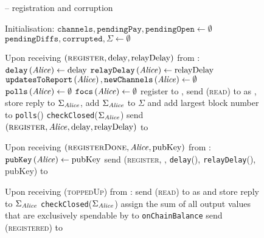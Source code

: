   \begin{figure}[H]
    \begin{systembox}{\fpaynet{} -- registration and corruption}
      \begin{algorithmic}[1]
        \State Initialisation:
        \Indent
          \State $\mathtt{channels}, \mathtt{pendingPay}, \mathtt{pendingOpen}
          \gets \emptyset$
          \State $\texttt{pendingDiffs}, \mathtt{corrupted}, \Sigma
          \gets \emptyset$
        \EndIndent
        \Statex

        \State Upon receiving $\left(\textsc{register}, \mathrm{delay},
        \mathrm{relayDelay}\right)$ from \alice:
        \Indent
          \State $\mathtt{delay}\left(\mathit{Alice}\right) \gets \mathrm{delay}$
          \State $\mathtt{relayDelay}\left(\mathit{Alice}\right) \gets
          \mathrm{relayDelay}$
          \State $\mathtt{updatesToReport}\left(\mathit{Alice}\right),
          \mathtt{newChannels}\left(\mathit{Alice}\right) \gets \emptyset$
          \State $\mathtt{polls}\left(\mathit{Alice}\right) \gets \emptyset$
          \State $\mathtt{focs}\left(\mathit{Alice}\right) \gets \emptyset$
          \State register \alice{} to \ledger{},
          send (\textsc{read}) to \ledger{} as \alice{}, store reply to
          $\Sigma_{\mathit{Alice}}$, add $\Sigma_{\mathit{Alice}}$ to $\Sigma$ and add largest
          block number to \texttt{polls}(\alice)
          \label{alg:fpaynet:support:read}
          \State \texttt{checkClosed}($\Sigma_{\mathit{Alice}}$)
          \State send $\left(\textsc{register}, \mathit{Alice}, \mathrm{delay},
          \mathrm{relayDelay}\right)$ to \simulator
        \EndIndent
        \Statex

        \State Upon receiving $\left(\textsc{registerDone}, \mathit{Alice},
        \mathrm{pubKey}\right)$ from \simulator:
        \Indent
          \State $\mathtt{pubKey}\left(\mathit{Alice}\right) \gets \mathrm{pubKey}$
          \State send (\textsc{register}, \alice, \texttt{delay}(\alice),
          \texttt{relayDelay}(\alice), pubKey) to \alice
        \EndIndent
        \Statex

        \State Upon receiving (\textsc{toppedUp}) from \alice:
        \Indent
          \State send (\textsc{read}) to \ledger{} as \alice{} and store reply
          to $\Sigma_{\mathit{Alice}}$
          \State \texttt{checkClosed}($\Sigma_{\mathit{Alice}}$)
          \State assign the sum of all output values that are exclusively
          spendable by \alice{} to \texttt{onChainBalance}
          \State send (\textsc{registered}) to \alice
        \EndIndent
        \Statex


\end{algorithmic}
\end{systembox}
\end{figure}
